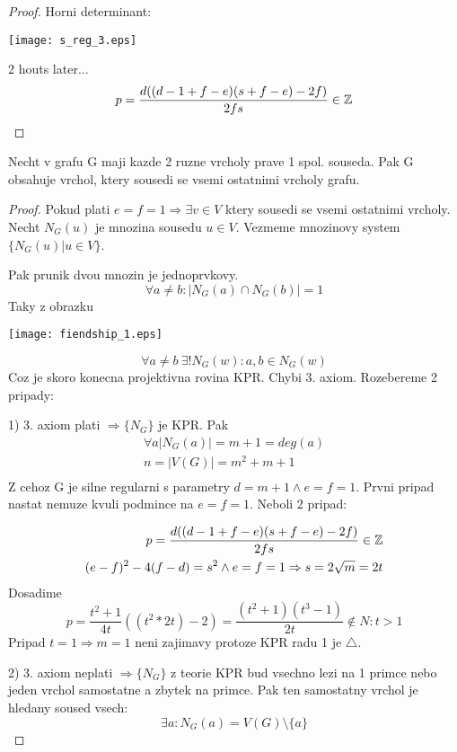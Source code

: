 \begin{proof}
	Horni determinant:

	\texttt{[image: s\_reg\_3.eps]}

	2 houts later...
	\[ p = \frac{d((d - 1 + f - e)(s + f - e) - 2f)}{2fs} \in \operatorname{\mathbb{Z}} \]
\end{proof}

\begin{theorem}
	Necht v grafu G maji kazde 2 ruzne vrcholy prave 1 spol. souseda.
	Pak G obsahuje vrchol, ktery sousedi se vsemi ostatnimi vrcholy grafu.
\end{theorem}
\begin{proof}
	Pokud plati $ e = f = 1 \Rightarrow \exists v \in V$ ktery sousedi se vsemi ostatnimi vrcholy. \\
	Necht $N_G(u)$ je mnozina sousedu $u \in V$. Vezmeme mnozinovy system $\{ N_G(u) | u \in V \}$.

	Pak prunik dvou mnozin je jednoprvkovy.
	\[ \forall a \ne b: |N_G(a) \cap N_G(b)| = 1 \]
	Taky z obrazku

	\texttt{[image: fiendship\_1.eps]}

	\[ \forall a \ne b\ \exists! N_G(w): a,b \in N_G(w) \]
	Coz je skoro konecna projektivna rovina KPR. Chybi 3. axiom. Rozebereme 2 pripady:

	1) 3. axiom plati $\Rightarrow \{N_G\}$ je KPR. Pak
	\begin{equation*}
	\begin{split}
		\forall a |N_G(a)| = m + 1 = deg(a) \\
		n = |V(G)| = m^2 + m + 1\\
	\end{split}
	\end{equation*}
	Z cehoz G je silne regularni s parametry $ d = m + 1 \land e = f = 1$. Prvni pripad nastat nemuze kvuli podmince na $e = f = 1$. Neboli 2 pripad:

	\begin{equation*}
	\begin{aligned}
		p = \frac{d((d - 1 + f - e)(s + f - e) - 2f)}{2fs} \in \operatorname{\mathbb{Z}} \\
		(e - f)^2 - 4 (f - d) = s^2 \land e = f = 1 \Rightarrow s = 2 \sqrt{m} = 2t
	\end{aligned}
	\end{equation*}
	Dosadime
	\[ p = \frac{t^2 + 1}{4t}((t^2 * 2t) - 2) = \frac{(t^2 + 1)(t^3 - 1)}{2t} \notin N : t > 1 \]
	Pripad $t = 1 \Rightarrow m = 1$ neni zajimavy protoze KPR radu 1 je $\triangle$.

	2) 3. axiom neplati $\Rightarrow \{N_G\}$ z teorie KPR bud vsechno lezi na 1 primce nebo jeden vrchol samostatne a zbytek na primce. Pak ten samostatny vrchol je hledany soused vsech:
	\[ \exists a : N_G(a) = V(G)\setminus \{a\} \]

\end{proof}
